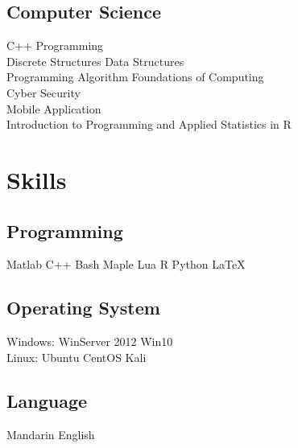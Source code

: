 \documentclass[]{deedy-resume-openfont}
\begin{document}
\begin{minipage}[t]{0.66\textwidth}
\subsection{Computer Science}
C++ Programming \\
Discrete Structures \textbullet{}
Data Structures \\
Programming Algorithm \textbullet{}
Foundations of Computing \\
Cyber Security \\
Mobile Application \\
Introduction to Programming and Applied Statistics in R \\
\sectionsep


\section{Skills}
\subsection{Programming}
Matlab \textbullet{} C++ \textbullet{} Bash \textbullet{} Maple \textbullet{}Lua \textbullet{}R \textbullet{} Python \textbullet{} \LaTeX\ \\ 
\vspace{\baselineskip}
\subsection{Operating System}
Windows: 
WinServer 2012 \textbullet{} Win10 \\
Linux: 
Ubuntu \textbullet{} CentOS \textbullet{} Kali \\
\vspace{\baselineskip}
\subsection{Language}
Mandarin \textbullet{} English
\sectionsep

\end{minipage} 
\hfill
\end{document}
